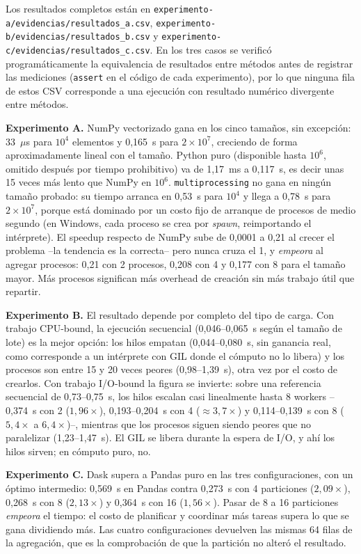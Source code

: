 \documentclass[11pt]{article}
\begin{document}
Los resultados completos están en
\texttt{experimento-a/evidencias/resultados\_a.csv},
\texttt{experimento-b/evidencias/resultados\_b.csv} y
\texttt{experimento-c/evidencias/resultados\_c.csv}. En los tres casos se
verificó programáticamente la equivalencia de resultados entre métodos antes
de registrar las mediciones (\texttt{assert} en el código de cada
experimento), por lo que ninguna fila de estos CSV corresponde a una
ejecución con resultado numérico divergente entre métodos.

\textbf{Experimento A.} NumPy vectorizado gana en los cinco tamaños, sin
excepción: 33~$\mu$s para $10^4$ elementos y 0,165~s para $2\times10^7$,
creciendo de forma aproximadamente lineal con el tamaño. Python puro
(disponible hasta $10^6$, omitido después por tiempo prohibitivo) va de
1,17~ms a 0,117~s, es decir unas 15 veces más lento que NumPy en $10^6$.
\texttt{multiprocessing} no gana en ningún tamaño probado: su tiempo arranca en
0,53~s para $10^4$ y llega a 0,78~s para $2\times10^7$, porque está dominado
por un costo fijo de arranque de procesos de medio segundo (en Windows, cada
proceso se crea por \emph{spawn}, reimportando el intérprete). El speedup
respecto de NumPy sube de 0,0001 a 0,21 al crecer el problema --la tendencia es
la correcta-- pero nunca cruza el 1, y \emph{empeora} al agregar procesos:
0,21 con 2 procesos, 0,208 con 4 y 0,177 con 8 para el tamaño mayor. Más
procesos significan más overhead de creación sin más trabajo útil que repartir.

\textbf{Experimento B.} El resultado depende por completo del tipo de carga.
Con trabajo CPU-bound, la ejecución secuencial (0,046--0,065~s según el tamaño
de lote) es la mejor opción: los hilos empatan (0,044--0,080~s, sin ganancia
real, como corresponde a un intérprete con GIL donde el cómputo no lo libera) y
los procesos son entre 15 y 20 veces peores (0,98--1,39~s), otra vez por el
costo de crearlos. Con trabajo I/O-bound la figura se invierte: sobre una
referencia secuencial de 0,73--0,75~s, los hilos escalan casi linealmente hasta
8 workers --0,374~s con 2 ($1,96\times$), 0,193--0,204~s con 4
($\approx3,7\times$) y 0,114--0,139~s con 8 ($5,4\times$ a $6,4\times$)--,
mientras que los procesos siguen siendo peores que no paralelizar
(1,23--1,47~s). El GIL se libera durante la espera de I/O, y ahí los hilos
sirven; en cómputo puro, no.

\textbf{Experimento C.} Dask supera a Pandas puro en las tres configuraciones,
con un óptimo intermedio: 0,569~s en Pandas contra 0,273~s con 4 particiones
($2,09\times$), 0,268~s con 8 ($2,13\times$) y 0,364~s con 16 ($1,56\times$).
Pasar de 8 a 16 particiones \emph{empeora} el tiempo: el costo de planificar y
coordinar más tareas supera lo que se gana dividiendo más. Las cuatro
configuraciones devuelven las mismas 64 filas de la agregación, que es la
comprobación de que la partición no alteró el resultado.
\end{document}
